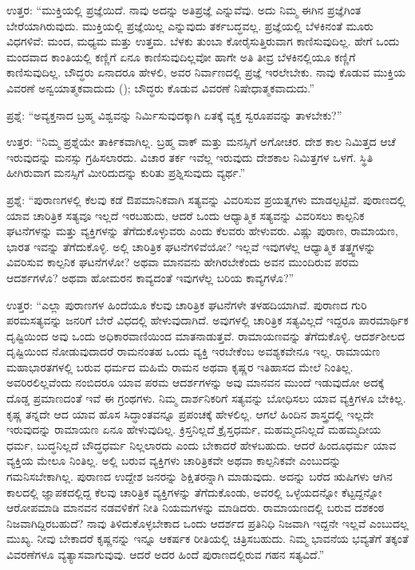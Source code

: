 \vskip 1pt

 ಉತ್ತರ: “ಮುಕ್ತಿಯಲ್ಲಿ ಪ್ರಜ್ಞೆಯಿದೆ. ನಾವು ಅದನ್ನು ಅತಿಪ್ರಜ್ಞೆ ಎನ್ನುವೆವು. ಅದು ನಿಮ್ಮ ಈಗಿನ ಪ್ರಜ್ಞೆಗಿಂತ ಬೇರೆಯಾಗಿರುವುದು. ಮುಕ್ತಿಯಲ್ಲಿ ಪ್ರಜ್ಞೆಯಿಲ್ಲ ಎನ್ನುವುದು ತರ್ಕಬದ್ಧವಲ್ಲ. ಪ್ರಜ್ಞೆಯಲ್ಲಿ ಬೆಳಕಿನಂತೆ ಮೂರು ವಿಧಗಳಿವೆ: ಮಂದ, ಮಧ್ಯಮ ಮತ್ತು ಉತ್ತಮ. ಬೆಳಕು ತುಂಬಾ ಕೋರೈಸುತ್ತಿರುವಾಗ ಕಾಣಿಸುವುದಿಲ್ಲ. ಹೇಗೆ ಒಂದು ಮಂದವಾದ ಕಾಂತಿಯಲ್ಲಿ ಕಣ್ಣಿಗೆ ಏನೂ ಕಾಣಿಸುವುದಿಲ್ಲವೋ ಹಾಗೇ ಅತಿ ತೀವ್ರ ಬೆಳಕಿನಲ್ಲಿಯೂ ಕಣ್ಣಿಗೆ ಕಾಣಿಸುವುದಿಲ್ಲ. ಬೌದ್ಧರು ಏನಾದರೂ ಹೇಳಲಿ, ಅವರ ನಿರ್ವಾಣದಲ್ಲಿ ಪ್ರಜ್ಞೆ ಇರಲೇಬೇಕು. ನಾವು ಕೊಡುವ ಮುಕ್ತಿಯ ವಿವರಣೆ ಅನ್ವಯಾತ್ಮಕವಾದುದು (); ಬೌದ್ಧರು ಕೊಡುವ ವಿವರಣೆ ನಿಷೇಧಾತ್ಮಕವಾದುದು.” 

\vskip 1pt

 ಪ್ರಶ್ನೆ: “ಅವ್ಯಕ್ತನಾದ ಬ್ರಹ್ಮ ವಿಶ್ವವನ್ನು ನಿರ್ಮಿಸುವುದಕ್ಕಾಗಿ ಏತಕ್ಕೆ ವ್ಯಕ್ತ ಸ್ವರೂಪವನ್ನು ತಾಳಬೇಕು?” 

\vskip 1pt

 ಉತ್ತರ: “ನಿಮ್ಮ ಪ್ರಶ್ನೆಯೇ ತಾರ್ಕಿಕವಾಗಿಲ್ಲ. ಬ್ರಹ್ಮ ವಾಕ್ ಮತ್ತು ಮನಸ್ಸಿಗೆ ಅಗೋಚರ. ದೇಶ ಕಾಲ ನಿಮಿತ್ತದ ಆಚೆ ಇರುವುದನ್ನು ಮನಸ್ಸು ಗ್ರಹಿಸಲಾರದು. ವಿಚಾರ ತರ್ಕ ಇವೆಲ್ಲ ಇರುವುದು ದೇಶಕಾಲ ನಿಮಿತ್ತಗಳ ಒಳಗೆ. ಸ್ಥಿತಿ ಹೀಗಿರುವಾಗ ಮನಸ್ಸಿಗೆ ಮೀರಿದುದನ್ನು ಕುರಿತು ಪ್ರಶ್ನಿಸುವುದು ವ್ಯರ್ಥ.” 

 ಪ್ರಶ್ನೆ: “ಪುರಾಣಗಳಲ್ಲಿ ಕೆಲವು ಕಡೆ ಔಪಮಾನಿಕವಾಗಿ ಸತ್ಯವನ್ನು ವಿವರಿಸುವ ಪ್ರಯತ್ನಗಳು ಮಾಡಲ್ಪಟ್ಟಿವೆ. ಪುರಾಣದಲ್ಲಿ ಯಾವ ಚಾರಿತ್ರಿಕ ಸತ್ಯವೂ ಇಲ್ಲದೆ ಇರಬಹುದು, ಆದರೆ ಒಂದು ಆಧ್ಯಾತ್ಮಿಕ ಸತ್ಯವನ್ನು ವಿವರಿಸಲು ಕಾಲ್ಪನಿಕ ಘಟನೆಗಳನ್ನು ಮತ್ತು ವ್ಯಕ್ತಿಗಳನ್ನು ತೆಗೆದುಕೊಳ್ಳುವರು ಎಂದು ಕೆಲವರು ಹೇಳುವರು. ವಿಷ್ಣು ಪುರಾಣ, ರಾಮಾಯಣ, ಭಾರತ ಇವನ್ನು ತೆಗೆದುಕೊಳ್ಳಿ. ಅಲ್ಲಿ ಚಾರಿತ್ರಿಕ ಘಟನೆಗಳಿವೆಯೋ? ಇಲ್ಲವೆ ಇವುಗಳೆಲ್ಲ ಆಧ್ಯಾತ್ಮಿಕ ತತ್ತ್ವಗಳನ್ನು ವಿವರಿಸುವ ಕಾಲ್ಪನಿಕ ಘಟನೆಗಳೋ? ಅಥವಾ ಮಾನವನು ಹೇಗಿರಬೇಕೆಂದು ಅವನ ಮುಂದಿರುವ ಪರಮ ಆದರ್ಶಗಳೊ? ಅಥವಾ ಹೋಮರನ ಕಾವ್ಯದಂತೆ ಇವುಗಳೆಲ್ಲ ಬರಿಯ ಕಾವ್ಯಗಳೊ?” 

 ಉತ್ತರ: “ಎಲ್ಲಾ ಪುರಾಣಗಳ ಹಿಂದೆಯೂ ಕೆಲವು ಚಾರಿತ್ರಿಕ ಘಟನೆಗಳೇ ತಳಹದಿಯಾಗಿವೆ. ಪುರಾಣದ ಗುರಿ ಪರಮಸತ್ಯವನ್ನು ಜನರಿಗೆ ಬೇರೆ ವಿಧದಲ್ಲಿ ಹೇಳುವುದಾಗಿದೆ. ಅವುಗಳಲ್ಲಿ ಚಾರಿತ್ರಿಕ ಸತ್ಯವಿಲ್ಲದೆ ಇದ್ದರೂ ಪಾರಮಾರ್ಥಿಕ ದೃಷ್ಟಿಯಿಂದ ಅವು ಒಂದು ಅಧಿಕಾರವಾಣಿಯಿಂದ ಮಾತನಾಡುತ್ತವೆ. ರಾಮಾಯಣವನ್ನು ತೆಗೆದುಕೊಳ್ಳಿ. ಆದರ್ಶಶೀಲದ ದೃಷ್ಟಿಯಿಂದ ನೋಡುವುದಾದರೆ ರಾಮನಂತಹ ಒಂದು ವ್ಯಕ್ತಿ ಇರಬೇಕೆಂಬ ಅವಶ್ಯಕವೇನೂ ಇಲ್ಲ. ರಾಮಾಯಣ ಮಹಾಭಾರತಗಳಲ್ಲಿ ಬರುವ ಧರ್ಮದ ಮಹಿಮೆ ರಾಮನ ಅಥವಾ ಕೃಷ್ಣರ ಇತಿಹಾಸದ ಮೇಲೆ ನಿಂತಿಲ್ಲ. ಅವರಿರಲಿಲ್ಲವೆಂದು ನಂಬಿದರೂ ಯಾವ ಪರಮ ಆದರ್ಶಗಳನ್ನು ಅವು ಮಾನವನ ಮುಂದೆ ಇಡುವುದೋ ಅದಕ್ಕೆ ದೊಡ್ಡ ಪ್ರಮಾಣದಂತೆ ಇವೆ ಈ ಗ್ರಂಥಗಳು. ನಿಮ್ಮ ದಾರ್ಶನಿಕರಿಗೆ ಸತ್ಯವನ್ನು ಬೋಧಿಸಲು ಯಾವ ವ್ಯಕ್ತಿಗಳೂ ಬೇಕಿಲ್ಲ. ಕೃಷ್ಣ ತನ್ನದೇ ಆದ ಯಾವ ಹೊಸ ಸಿದ್ಧಾಂತವನ್ನೂ ಪ್ರಪಂಚಕ್ಕೆ ಹೇಳಲಿಲ್ಲ. ಆಗಲೆ ಹಿಂದಿನ ಶಾಸ್ತ್ರದಲ್ಲಿ ಇಲ್ಲದೇ ಇರುವುದನ್ನು ರಾಮಾಯಣ ಏನೂ ಹೇಳುವುದಿಲ್ಲ. ಕ್ರಿಸ್ತನಿಲ್ಲದೆ ಕ್ರೈಸ್ತಧರ್ಮ, ಮಹಮ್ಮದನಿಲ್ಲದೆ ಮಹಮ್ಮದೀಯ ಧರ್ಮ, ಬುದ್ಧನಿಲ್ಲದೆ ಬೌದ್ಧಧರ್ಮ ನಿಲ್ಲಲಾರದು ಎಂದು ಬೇಕಾದರೆ ಹೇಳಬಹುದು. ಆದರೆ ಹಿಂದೂಧರ್ಮ ಯಾವ ವ್ಯಕ್ತಿಯ ಮೇಲೂ ನಿಂತಿಲ್ಲ. ಅಲ್ಲಿ ಬರುವ ವ್ಯಕ್ತಿಗಳು ಚಾರಿತ್ರಿಕವೇ ಅಥವಾ ಕಾಲ್ಪನಿಕವೇ ಎಂಬುದನ್ನು ಗಮನಿಸಬೇಕಾಗಿಲ್ಲ. ಪುರಾಣದ ಉದ್ದೇಶ ಜನರನ್ನು ಶಿಕ್ಷಿತರನ್ನಾಗಿ ಮಾಡುವುದು. ಅದನ್ನು ಬರೆದ ಋಷಿಗಳು ಆಗಿನ ಕಾಲದಲ್ಲಿ ಜ್ಞಾಪಕದಲ್ಲಿದ್ದ ಕೆಲವು ಚಾರಿತ್ರಿಕ ವ್ಯಕ್ತಿಗಳನ್ನು ತೆಗೆದುಕೊಂಡು, ಅವರಲ್ಲಿ ಒಳ್ಳೆಯದನ್ನೋ ಕೆಟ್ಟದ್ದನ್ನೋ ಆರೋಪಮಾಡಿ ಮಾನವನ ನಡವಳಿಕೆಗೆ ನೀತಿ ನಿಯಮಗಳನ್ನು ಮಾಡಿದರು. ರಾಮಾಯಣದಲ್ಲಿ ಬರುವ ದಶಕಂಠ ನಿಜವಾಗಿದ್ದಿರಬಹುದೆ? ನಾವು ತಿಳಿದುಕೊಳ್ಳಬೇಕಾದ ಒಂದು ಆದರ್ಶದ ಪ್ರತಿನಿಧಿ ನಿಜವಾಗಿ ಇದ್ದನೇ ಇಲ್ಲವೆ ಎಂಬುದಲ್ಲ ಮುಖ್ಯ. ನೀವು ಬೇಕಾದರೆ ಕೃಷ್ಣನನ್ನು ಇನ್ನೂ ಆಕರ್ಷಕ ರೀತಿಯಲ್ಲಿ ಚಿತ್ರಿಸಬಹುದು. ನಿಮ್ಮ ಭಾವನೆಯ ಭವ್ಯತೆಗೆ ತಕ್ಕಂತೆ ವಿವರಣೆಗಳೂ ವ್ಯತ್ಯಾಸವಾಗುವುವು. ಆದರೆ ಅದರ ಹಿಂದೆ ಪುರಾಣದಲ್ಲಿರುವ ಗಹನ ಸತ್ಯವಿದೆ.” 

